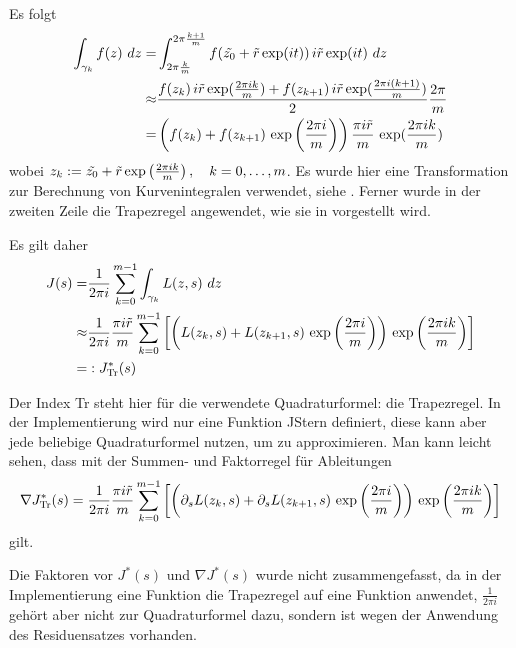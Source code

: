 \documentclass[a4paper,12pt]{report}
\newcommand{\zitat}[1]{\glqq #1\grqq}
\newcommand{\klammer}[1]{\left(#1\right)}
\newcommand{\1}{\mathds{1}}
\theoremstyle{plain} %
\theoremstyle{definition} %
\theoremstyle{remark}
\begin{document}
            Es folgt
            \begin{align}
                  \int_{\gamma_k} f(z)\ dz =& \int_{2 \pi \frac k m}^{2\pi \frac {k+1} m} f(\Tilde{z_0}+\Tilde r\exp(it))\,i\Tilde r\exp(it)\ dz\label{eqn: Teilintegral Kurve zu Intergral normal}\\
                  \approx& \frac{f(z_k)\,i\Tilde r\exp(\frac{2\pi i k}{m})+f(z_{k+1})\,i\Tilde r\exp(\frac{2\pi i (k+1)}{m})}{2} \frac{2\pi} m\nonumber\\
                  =& \klammer{f(z_k)+f(z_{k+1})\,\exp\klammer{\frac{2\pi i}{m}}}\frac{\pi i \Tilde r} m \,\exp(\frac{2\pi i k}{m})\nonumber
            \end{align}
            wobei $z_k:=\Tilde{z_0}+\Tilde r\exp\klammer{\frac {2\pi ik} m}, \quad k=0,\dots,m$.
            Es wurde hier eine Transformation zur Berechnung von Kurvenintegralen verwendet, siehe \cite[S. 21]{complexAnalysisVL}.
            Ferner wurde in der zweiten Zeile die Trapezregel angewendet, wie sie in \cite[S. 498]{numerikHermann} vorgestellt wird.
            
            Es gilt daher
            \begin{align}
                  J(s) =& \frac{1}{2\pi i}\sum_{k=0}^{m-1}\int_{\gamma_k} L(z,s)\ dz\nonumber\\
                  \approx& \frac{1}{2\pi i}\frac{\pi i \Tilde r} m\sum_{k=0}^{m-1}\left[\klammer{L(z_k, s)+
                  L(z_{k+1}, s)\,\exp\klammer{\frac{2\pi i}{m}}}\,\exp\klammer{\frac{2\pi i k}{m}}\right]\label{def: JSternTrapez}\\
                  =&:J_{\text{Tr}}^*(s)\nonumber
            \end{align}

            Der Index \zitat{Tr} steht hier für die verwendete Quadraturformel: die Trapezregel.
            In der Implementierung wird nur eine Funktion \zitat{JStern} definiert, diese kann aber jede beliebige Quadraturformel nutzen, um \J zu approximieren.
            Man kann leicht sehen, dass mit der Summen- und Faktorregel für Ableitungen
            $$\nabla J_{\text{Tr}}^*(s) = \frac{1}{2\pi i}\frac{\pi i \Tilde r} m\sum_{k=0}^{m-1}\left[\klammer{\partial_s L(z_k, s)+\partial_s L(z_{k+1}, s)\,
            \exp\klammer{\frac{2\pi i}{m}}}\,\exp\klammer{\frac{2\pi i k}{m}}\right]$$
            gilt.

            Die Faktoren vor $J^*(s)$ und $\nabla J^*(s)$ wurde nicht zusammengefasst, da in der Implementierung eine Funktion die Trapezregel auf eine Funktion anwendet,
            $\frac 1 {2\pi i}$ gehört aber nicht zur Quadraturformel dazu, sondern ist wegen der Anwendung des Residuensatzes vorhanden.
\end{document}
